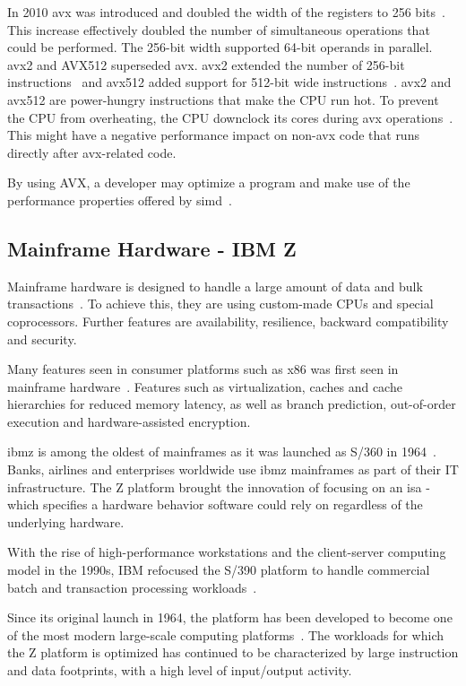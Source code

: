 In 2010 \gls{avx} was introduced and doubled the width of the registers to 256 bits~\cite{hennessy2011:avx, intel:avx}. This increase effectively doubled the number of simultaneous operations that could be performed. The 256-bit width supported 64-bit operands in parallel. \gls{avx2} and AVX512 superseded \gls{avx}. \gls{avx2} extended the number of 256-bit instructions~\cite{intel:manual:2020} and \gls{avx512} added support for 512-bit wide instructions~\cite{intel:avx512}. \gls{avx2} and \gls{avx512} are power-hungry instructions that make the CPU run hot. To prevent the CPU from overheating, the CPU downclock its cores during \gls{avx} operations~\cite{hackenberg2015, intel:manual:2020}. This might have a negative performance impact on non-\gls{avx} code that runs directly after \gls{avx}-related code.

By using AVX, a developer may optimize a program and make use of the performance properties offered by \gls{simd}~\cite{hennessy2011:avx}.

\subsection{Mainframe Hardware - IBM Z}

Mainframe hardware is designed to handle a large amount of data and bulk transactions~\cite{mainframes}. To achieve this, they are using custom-made CPUs and special coprocessors. Further features are availability, resilience, backward compatibility and security.

Many features seen in consumer platforms such as \gls{x86} was first seen in mainframe hardware~\cite{jacobi2020}. Features such as virtualization, caches and cache hierarchies for reduced memory latency, as well as branch prediction, out-of-order execution and hardware-assisted encryption.

\gls{ibmz} is among the oldest of mainframes as it was launched as S/360 in 1964~\cite{jacobi2020}. Banks, airlines and enterprises worldwide use \gls{ibmz} mainframes as part of their IT infrastructure. The Z platform brought the innovation of focusing on an \acrfull{isa} - which specifies a hardware behavior software could rely on regardless of the underlying hardware.

With the rise of high-performance workstations and the client-server computing model in the 1990s, IBM refocused the S/390 platform to handle commercial batch and transaction processing workloads~\cite{jacobi2020}. 

Since its original launch in 1964, the platform has been developed to become one of the most modern large-scale computing platforms~\cite{jacobi2020}. The workloads for which the Z platform is optimized has continued to be characterized by large instruction and data footprints, with a high level of input/output activity.

